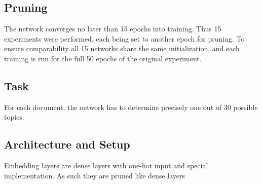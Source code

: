 \subsection*{Pruning}
The network converges no later than 15 epochs into training. Thus 15 experiments were performed, each being set to another epoch for pruning. 
To ensure comparability all 15 networks share the same initialization, and each training is run for the full  50 epochs of the original experiment.



\subsection*{Task}
For each document, the network has to determine precisely one out of 30 possible topics.

\subsection*{Architecture and Setup}
Embedding layers are dense layers with one-hot input and special implementation. As such they are pruned like dense layers


